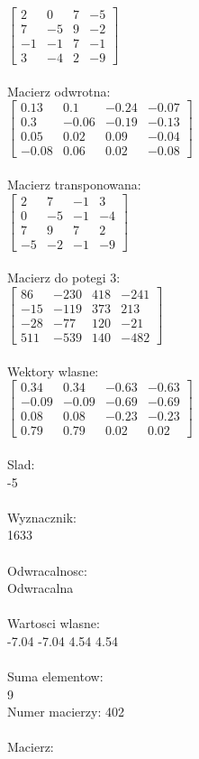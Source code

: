 \documentclass[a4paper,12pt]{article}
\begin{document}
$\begin{bmatrix} 2&0&7&-5\\7&-5&9&-2\\-1&-1&7&-1\\3&-4&2&-9 \end{bmatrix}$
\\
\\
Macierz odwrotna:\\

$\begin{bmatrix} 0.13&0.1&-0.24&-0.07\\0.3&-0.06&-0.19&-0.13\\0.05&0.02&0.09&-0.04\\-0.08&0.06&0.02&-0.08 \end{bmatrix}$
\\
\\
Macierz transponowana:\\

$\begin{bmatrix} 2&7&-1&3\\0&-5&-1&-4\\7&9&7&2\\-5&-2&-1&-9 \end{bmatrix}$
\\
\\
Macierz do potegi 3:\\

$\begin{bmatrix} 86&-230&418&-241\\-15&-119&373&213\\-28&-77&120&-21\\511&-539&140&-482 \end{bmatrix}$
\\
\\
Wektory wlasne:\\

$\begin{bmatrix} 0.34&0.34&-0.63&-0.63\\-0.09&-0.09&-0.69&-0.69\\0.08&0.08&-0.23&-0.23\\0.79&0.79&0.02&0.02 \end{bmatrix}$
\\
\\
Slad:\\
-5
\\
\\
Wyznacznik:\\
1633
\\
\\
Odwracalnosc:\\
Odwracalna
\\
\\
Wartosci wlasne:\\
-7.04 -7.04 4.54 4.54
\\
\\
Suma elementow:\\
9
\\
\newpage
Numer macierzy:
402
\\
\\
Macierz:\\
\end{document}
